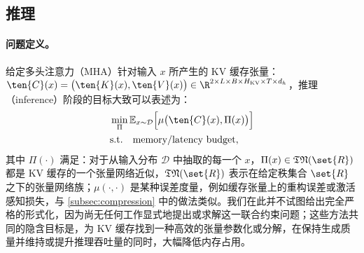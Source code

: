 \subsection{推理}
\label{subsec:inference}

\paragraph{问题定义。} 给定多头注意力（MHA）针对输入 $x$ 所产生的 KV 缓存张量：$\ten{C}(x) = \bigl(\ten{K}(x), \ten{V}(x)\bigr) \in\R^{2\times L\times B\times H_{\rm KV}\times T\times d_h}$，推理（inference）阶段的目标大致可以表述为：
\begin{equation}
  \begin{aligned}
      & \min_{\Pi} \mathbb{E}_{x \sim \mathcal{D}} \Bigl[ \mu \bigl(\ten{C}(x), \Pi(x)\bigr) \Bigr] \\
      & \rm s.t. \quad \text{memory/latency budget},
  \end{aligned}
\end{equation}
其中 $\Pi(\cdot)$ 满足：对于从输入分布 $\mathcal{D}$ 中抽取的每一个 $x$，$\Pi(x) \in \mathfrak{TN}(\set{R})$ 都是 KV 缓存的一个张量网络近似，$\mathfrak{TN}(\set{R})$ 表示在给定秩集合 $\set{R}$ 之下的张量网络族；$\mu(\cdot, \cdot)$ 是某种误差度量，例如缓存张量上的重构误差或激活感知损失，与 \cref{subsec:compression} 中的做法类似。我们在此并不试图给出完全严格的形式化，因为尚无任何工作显式地提出或求解这一联合约束问题；这些方法共同的隐含目标是，为 KV 缓存找到一种高效的张量参数化或分解，在保持生成质量并维持或提升推理吞吐量的同时，大幅降低内存占用。





